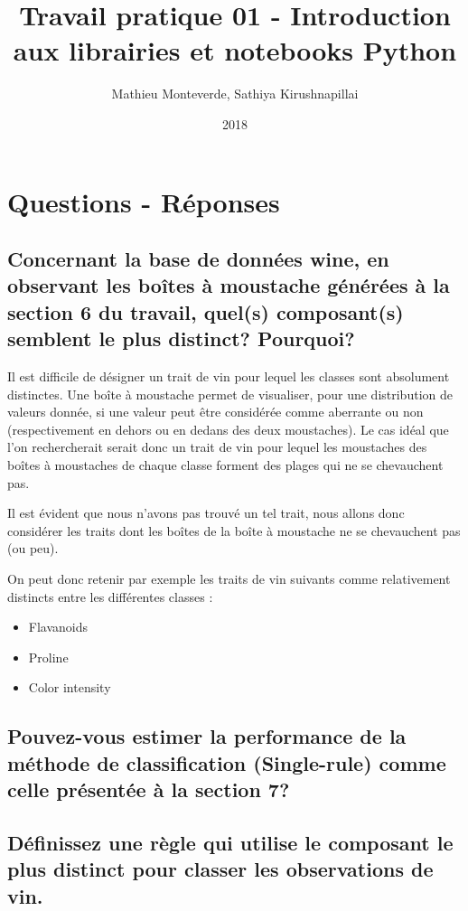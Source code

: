 \documentclass[11pt, french]{article}
\title{Travail pratique 01 - Introduction aux librairies et notebooks Python}
\date{2018}
\author{Mathieu Monteverde, Sathiya Kirushnapillai}
\begin{document}
\maketitle

\setlength{\parindent}{0em}
\setlength{\parskip}{1em}


\section*{Questions - Réponses}

\subsection*{Concernant la base de données wine, en observant les boîtes à moustache générées à la section 6 du travail, quel(s) composant(s) semblent le plus distinct? Pourquoi?}

Il est difficile de désigner un trait de vin pour lequel les classes sont absolument distinctes. Une boîte à moustache permet de visualiser, pour une distribution de valeurs donnée, si une valeur peut être considérée comme aberrante ou non (respectivement en dehors ou en dedans des deux moustaches). Le cas idéal que l'on rechercherait serait donc un trait de vin pour lequel les moustaches des boîtes à moustaches de chaque classe forment des plages qui ne se chevauchent pas.

Il est évident que nous n'avons pas trouvé un tel trait, nous allons donc considérer les traits dont les boîtes de la boîte à moustache ne se chevauchent pas (ou peu).

On peut donc retenir par exemple les traits de vin suivants comme relativement distincts entre les différentes classes :

\begin{itemize}
	\item Flavanoids
	\item Proline
	\item Color intensity
\end{itemize}

\subsection*{Pouvez-vous estimer la performance de la méthode de classification (Single-rule) comme celle présentée à la section 7?}


\subsection*{Définissez une règle qui utilise le composant le plus distinct pour classer les observations de vin.}
\end{document}
